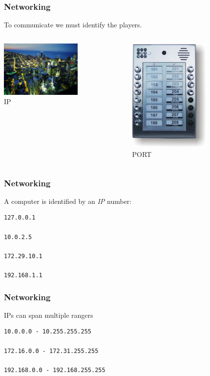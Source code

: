 \begin{frame}
\frametitle{Networking}
To communicate we must identify the players.\\

\begin{columns}
\begin{column}{0.5\textwidth}
\begin{center}
\includegraphics[width=4cm]{./Figure/network/ChicagovanafSearsTower}\\
IP
\end{center}
\end{column}
\begin{column}{0.5\textwidth}
\begin{center}
\includegraphics[width=4cm]{./Figure/network/BellGuard_Front_small}\\
PORT
\end{center}
\end{column}
\end{columns}
\end{frame}

\begin{frame}[fragile]
\frametitle{Networking}
A computer is identified by an \textit{IP} number:
\begin{lstlisting}
127.0.0.1

10.0.2.5

172.29.10.1

192.168.1.1
\end{lstlisting}
\end{frame}

\begin{frame}[fragile]
\frametitle{Networking}
IPs can span multiple rangers
\begin{lstlisting}
10.0.0.0 - 10.255.255.255

172.16.0.0 - 172.31.255.255

192.168.0.0 - 192.168.255.255
\end{lstlisting}
\end{frame}

